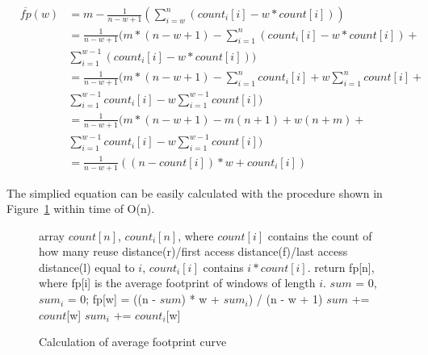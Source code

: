 \begin{eqnarray}
&\overline{fp}(w) & =  m - \frac{1}{n-w+1} (
  \sum_{i=w}^{n}(count_i[i]-w*count[i]))\nonumber\\
&\ &=\frac{1}{n-w+1}(m*(n-w+1)-\sum_{i=1}^{n}(count_i[i]-w*count[i]) +\nonumber\\
&\ &\sum_{i=1}^{w-1}(count_i[i]-w*count[i]))\nonumber\\
&\ &=\frac{1}{n-w+1}(m*(n-w+1)-\sum_{i=1}^{n}count_i[i]+w\sum_{i=1}^{n}count[i] +\nonumber\\
&\ &\sum_{i=1}^{w-1}count_i[i]-w\sum_{i=1}^{w-1}count[i])\nonumber\\
&\ &=\frac{1}{n-w+1}(m*(n-w+1)-m(n+1)+w(n+m)+\nonumber\\
&\ &\sum_{i=1}^{w-1}count_i[i]-w\sum_{i=1}^{w-1}count[i])\nonumber\\
&\ &=\frac{1}{n-w+1}((n-count[i])*w + count_i[i])
\end{eqnarray}

The simplied equation can be easily calculated with
the procedure shown in Figure~\ref{alg:aver-fp} within time of O(n).

\renewcommand{\algorithmicrequire}{\textbf{Procedure}}
\begin{figure}[h!]
  \centering
  \begin{minipage}{\linewidth}
    \begin{algorithmic}[1]
      \REQUIRE array $count[n]$, $count_i[n]$, where $count[i]$ contains the
      count of how many reuse distance(r)/first access
      distance(f)/last access distance(l) equal to $i$, $count_i[i]$ contains $i*count[i]$.
      \STATE return fp[n], where fp[i] is the average footprint of
      windows of length $i$.
      \STATE $sum$ = 0, $sum_i$ = 0;
      \STATE  fp[w] = ((n - $sum$) * w + $sum_i$) / (n - w + 1)
      \STATE  $sum$ += $count$[w]
      \STATE  $sum_i$ += $count_i$[w]
      \ENDFOR
    \end{algorithmic}
    \caption{Calculation of average footprint curve}
    \label{alg:aver-fp}
  \end{minipage}
\end{figure}


